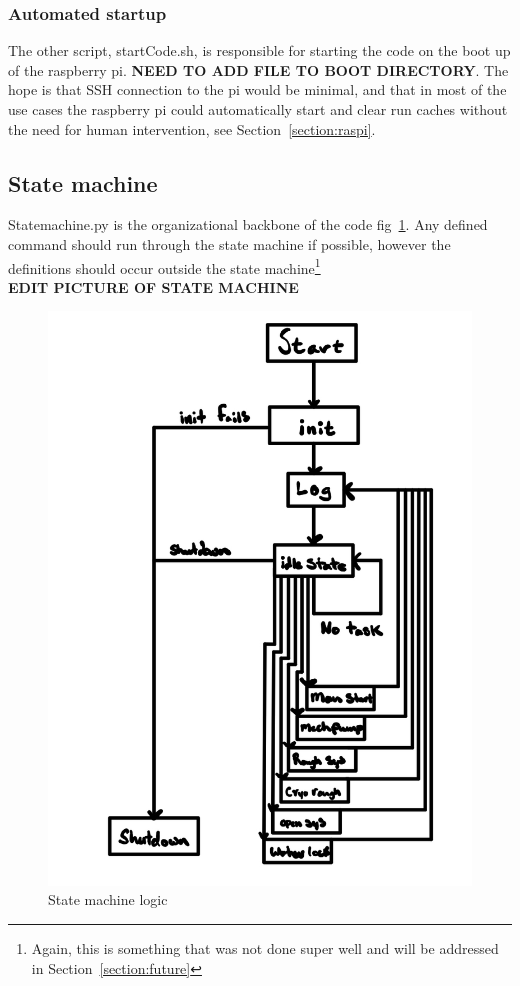 \documentclass[titlepage]{article}
\begin{document}
\subsubsection{Automated startup}
The other script, startCode.sh, is responsible for starting the code on the boot up of the raspberry pi. \textbf{NEED TO ADD FILE TO BOOT DIRECTORY}. The hope is that SSH connection to the pi would be minimal, and that in most of the use cases the raspberry pi could automatically start and clear run caches without the need for human intervention, see Section~\ref{section:raspi}.

\subsection{State machine}
\label{section:state}
Statemachine.py is the organizational backbone of the code fig~\ref{fig:state}. Any defined command should run through the state machine if possible, however the definitions should occur outside the state machine\footnote{Again, this is something that was not done super well and will be addressed in Section~\ref{section:future}}\\ \textbf{EDIT PICTURE OF STATE MACHINE}\

\begin{center}
    \begin{figure}[h!]
      \includegraphics[scale=0.4]{IMG_0432.jpg}
      \caption{State machine logic}
      \label{fig:state}
    \end{figure}
\end{center}
\end{document}
